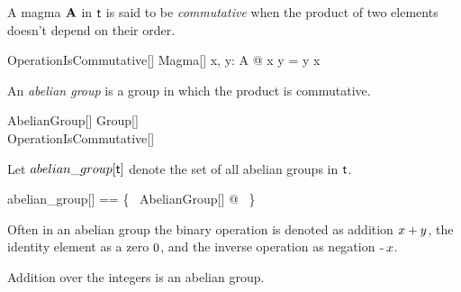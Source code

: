 \documentclass{amsart}
\begin{document}
A magma $\mathbf{A}$ in $\mathsf{t}$ is said to be {\em commutative} when the product of two elements doesn't depend on 
their order.
\begin{schema}{OperationIsCommutative}[\genT]
	Magma[\genT]
\where
	\forall x, y: A @ x \opG y = y \opG x
\end{schema}

An \textit{abelian group} is a group in which the product is commutative.

\begin{schema}{AbelianGroup}[\genT]
	Group[\genT] \\
	OperationIsCommutative[\genT]
\end{schema}

Let $abelian\_group[\mathsf{t}]$ denote the set of all abelian groups in $\mathsf{t}$.
\begin{zed}
	abelian\_group[\genT] == \{~ AbelianGroup[\genT] @ \strucA ~\}
\end{zed}

Often in an abelian group the binary operation is denoted as addition $x \mathbin{+} y$,
the identity element as a zero $0$, and the inverse operation as negation $\operatorname{-} x$.

\begin{example}
Addition over the integers is an abelian group.


\end{example}

\printbibliography
\end{document}
